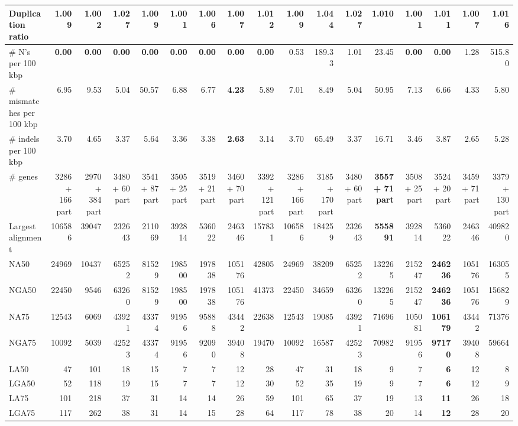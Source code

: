 \documentclass[12pt,a4paper]{article}
\begin{document}
\begin{table}[ht]
\begin{center}
\begin{tabular}{|l*{16}{|r}|}
Duplication ratio & 1.009 & 1.002 & 1.027 & 1.009 & {\bf 1.001} & 1.006 & 1.007 & 1.012 & 1.009 & 1.044 & 1.027 & 1.010 & {\bf 1.001} & 1.011 & 1.007 & 1.016 \\ \hline
\# N's per 100 kbp & {\bf 0.00} & {\bf 0.00} & {\bf 0.00} & {\bf 0.00} & {\bf 0.00} & {\bf 0.00} & {\bf 0.00} & {\bf 0.00} & 0.53 & 189.33 & 1.01 & 23.45 & {\bf 0.00} & {\bf 0.00} & 1.28 & 515.80 \\ \hline
\# mismatches per 100 kbp & 6.95 & 9.53 & 5.04 & 50.57 & 6.88 & 6.77 & {\bf 4.23} & 5.89 & 7.01 & 8.49 & 5.04 & 50.95 & 7.13 & 6.66 & 4.33 & 5.80 \\ \hline
\# indels per 100 kbp & 3.70 & 4.65 & 3.37 & 5.64 & 3.36 & 3.38 & {\bf 2.63} & 3.14 & 3.70 & 65.49 & 3.37 & 16.71 & 3.46 & 3.87 & 2.65 & 5.28 \\ \hline
\# genes & 3286 + 166 part & 2970 + 384 part & 3480 + 60 part & 3541 + 87 part & 3505 + 25 part & 3519 + 21 part & 3460 + 70 part & 3392 + 121 part & 3286 + 166 part & 3185 + 170 part & 3480 + 60 part & {\bf 3557 + 71 part} & 3508 + 25 part & 3524 + 20 part & 3459 + 71 part & 3379 + 130 part \\ \hline
Largest alignment & 106586 & 39047 & 232643 & 211069 & 392814 & 536022 & 246346 & 157831 & 106586 & 184259 & 232643 & {\bf 555891} & 392814 & 536022 & 246346 & 409820 \\ \hline
NA50 & 24969 & 10437 & 65252 & 81529 & 198500 & 197838 & 105176 & 42805 & 24969 & 38209 & 65252 & 132265 & 215247 & {\bf 246236} & 105176 & 163055 \\ \hline
NGA50 & 22450 & 9546 & 63260 & 81529 & 198500 & 197838 & 105176 & 41373 & 22450 & 34659 & 63260 & 132265 & 215247 & {\bf 246236} & 105176 & 156829 \\ \hline
NA75 & 12543 & 6069 & 43921 & 43374 & 91956 & 95888 & 43442 & 22638 & 12543 & 19085 & 43921 & 71696 & 105081 & {\bf 106179} & 43442 & 71376 \\ \hline
NGA75 & 10092 & 5039 & 42523 & 43374 & 91956 & 92090 & 39408 & 19470 & 10092 & 16587 & 42523 & 70982 & 91956 & {\bf 97170} & 39408 & 59664 \\ \hline
LA50 & 47 & 101 & 18 & 15 & 7 & 7 & 12 & 28 & 47 & 31 & 18 & 9 & 7 & {\bf 6} & 12 & 8 \\ \hline
LGA50 & 52 & 118 & 19 & 15 & 7 & 7 & 12 & 30 & 52 & 35 & 19 & 9 & 7 & {\bf 6} & 12 & 9 \\ \hline
LA75 & 101 & 218 & 37 & 31 & 14 & 14 & 26 & 59 & 101 & 65 & 37 & 19 & 13 & {\bf 11} & 26 & 18 \\ \hline
LGA75 & 117 & 262 & 38 & 31 & 14 & 15 & 28 & 64 & 117 & 78 & 38 & 20 & 14 & {\bf 12} & 28 & 20 \\ \hline
\end{tabular}
\end{center}
\end{table}
\end{document}
